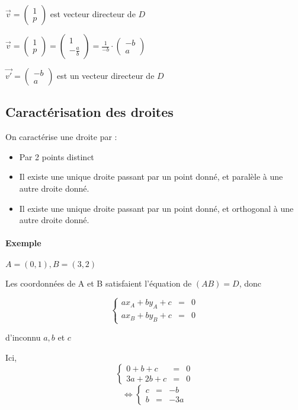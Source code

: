 $\vec{v} = \begin{pmatrix}
1 \\
p
\end{pmatrix}$ est vecteur directeur de $D$

$\vec{v} = \begin{pmatrix}
1\\
p
\end{pmatrix} = \begin{pmatrix}
1 \\
-\frac{a}{b}
\end{pmatrix} = \frac{1}{-b} \cdot \begin{pmatrix}
	-b \\
	a 
\end{pmatrix}$

$\vec{v'} = \begin{pmatrix}
	-b \\
	a
\end{pmatrix}$ est un vecteur directeur de $D$

\subsection{Caractérisation des droites}

On caractérise une droite par :
\begin{itemize}
	\item Par 2 points distinct
	\item Il existe une unique droite passant par  un point donné, et paralèle à une autre droite donné.
	\item Il existe une unique droite passant par  un point donné, et orthogonal à une autre droite donné.
\end{itemize}

\paragraph{Exemple} $A = (0, 1), B=(3, 2)$

Les coordonnées de A et B satisfaient l'équation de $(AB) = D$, donc

\[\left\{\begin{array}{rcl}
	ax_A + by_A + c &=& 0 \\
	ax_B + by_B + c &=& 0
\end{array}\right.\]

d'inconnu $a, b$ et $c$

Ici, 
\[\left\{\begin{array}{rcl}
	0 + b + c &=& 0 \\
	3a + 2b + c &=& 0
\end{array}\right.\]
\[\Leftrightarrow
\left\{\begin{array}{rcl}
	c &=& -b \\
	b &=& -3a
\end{array}\right.\]

